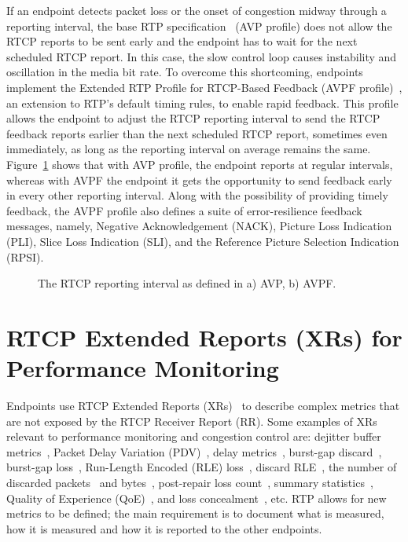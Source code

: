 
If an endpoint detects packet loss or the onset of congestion midway through a
reporting interval, the base RTP specification~\cite{rfc3550} (AVP profile)
does not allow the RTCP reports to be sent early and the endpoint has to wait for
the next scheduled RTCP report. In this case, the slow control loop causes
instability and oscillation in the media bit rate. To overcome this
shortcoming, endpoints implement the Extended RTP Profile for RTCP-Based
Feedback (AVPF profile)~\cite{rfc4585}, an extension to RTP's default timing
rules, to enable rapid feedback. This profile allows the endpoint to adjust the
RTCP reporting interval to send the RTCP feedback reports earlier than the
next scheduled RTCP report, sometimes even immediately, as long as the reporting
interval on average remains the same. Figure~\ref{fig:3:avpf.interval} shows
that with AVP profile, the endpoint reports at regular intervals, whereas with AVPF
the endpoint it gets the opportunity to send feedback early in every other reporting
interval. Along with the possibility of providing timely feedback, the AVPF
profile also defines a suite of error-resilience feedback messages, namely,
Negative Acknowledgement (NACK), Picture Loss Indication (PLI), Slice Loss
Indication (SLI), and the Reference Picture Selection Indication (RPSI).

\begin{figure}[!t]
\caption{The RTCP reporting interval as defined in a) AVP, b) AVPF.}
\label{fig:3:avpf.interval}
\end{figure}




\section{RTCP Extended Reports (XRs) for Performance Monitoring}

Endpoints use RTCP Extended Reports (XRs)~\cite{rfc3611} to describe complex
metrics that are not exposed by the RTCP Receiver Report (RR). Some examples
of XRs relevant to performance monitoring and congestion control are: dejitter
buffer metrics~\cite{rfc7005}, Packet Delay Variation (PDV)~\cite{rfc6798},
delay metrics~\cite{rfc6843}, burst-gap discard~\cite{rfc7003}, burst-gap
loss~\cite{rfc6958}, Run-Length Encoded (RLE) loss~\cite{rfc3611}, discard
RLE~\cite{rfc7097}, the number of discarded packets~\cite{rfc7002} and
bytes~\cite{rfc7243}, post-repair loss count~\cite{draft.xr.post.repair},
summary statistics~\cite{rfc7004, draft.webrtc.stats}, Quality of Experience
(QoE)~\cite{rfc7266}, and loss concealment~\cite{rfc7294}, etc. RTP allows for
new metrics to be defined; the main requirement is to document what is
measured, how it is measured and how it is reported to the other endpoints.


